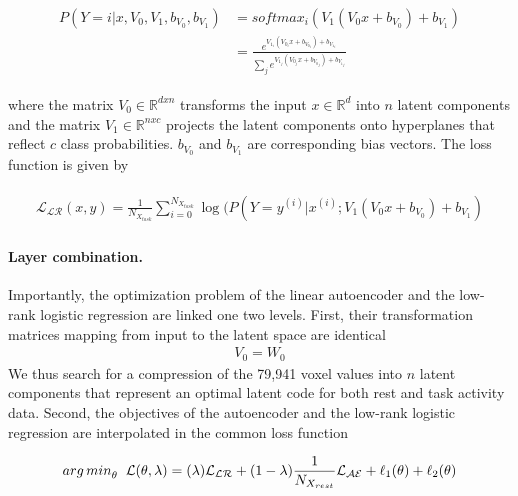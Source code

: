 \documentclass{article} %
\begin{document}
\begin{eqnarray}
  \begin{split}
    P(Y=i|x, V_0,V_1,b_{V_0}, b_{V_1}) &= softmax_i(V_1 (V_0 x + b_{V_0}) + b_{V_1}) \\
    &= \frac {e^{V_1_i (V_0_i x + b_{V_0}_i) + b_{V_1}_i}} {\sum_j e^{V_1_j (V_0_j x + b_{V_0}_j) + b_{V_1}_j}}            
  \end{split}
  \label{eq:lr}
\end{eqnarray}

where the matrix $V_0 \in \mathbb{R}^{dxn}$ transforms the input $x \in \mathbb{R}^{d}$
into $n$ latent components
and the matrix $V_1 \in \mathbb{R}^{nxc}$ projects the latent components
onto hyperplanes that reflect $c$ class probabilities.
$b_{V_0}$ and $b_{V_1}$ are corresponding
bias vectors.
The loss function is given by

\begin{eqnarray}
  \begin{split}
    {\mathcal{L_{LR}}}(x, y) = \frac{1}{N_{X_{task}}} \sum_{i=0}^{N_{X_{task}}} \log(P(Y=y^{(i)}|x^{(i)}; V_1 (V_0 x + b_{V_0}) + b_{V_1})
\end{split}
\label{eq:lr_loss}
\end{eqnarray}

\paragraph{Layer combination.}
Importantly, the optimization problem of the linear autoencoder
and the low-rank logistic regression
are linked one two levels. First, their transformation matrices mapping from
input to the latent space are identical
\begin{eqnarray}
  V_0 = W_0
\end{eqnarray}
We thus search for a compression of the 79,941 voxel values into $n$ latent
components that represent an optimal latent code for both
rest and task activity data.
Second, the objectives of the autoencoder and the low-rank
logistic regression are interpolated in the common loss function

\begin{eqnarray}
  \begin{split}
{arg\,min}_\theta \hspace{0.2cm} {\mathcal{L}}(\theta, \lambda) = (\lambda) {\mathcal{L_{LR}}}
+ (1-\lambda)\frac{1}{N_{X_{rest}}} {\mathcal{L_{AE}}} + \ell_1(\theta) + \ell_2(\theta)
  \label{eq:loss_equ}
\end{split}
\end{eqnarray}
\end{document}
